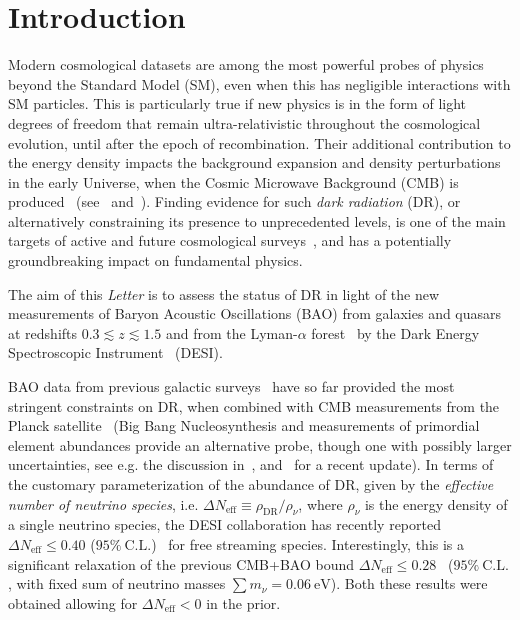 \documentclass[aps,prd,twocolumn,notitlepage,
superscriptaddress,
nofootinbib,floatfix]{revtex4-2}
\begin{document}

\maketitle
\vspace{1em}\noindent

\section{Introduction}
\label{sec:introduction}

Modern cosmological datasets are among the most powerful probes of physics beyond the Standard Model (SM), even when this has negligible interactions with SM particles. This is particularly true if new physics is in the form of light degrees of freedom that remain ultra-relativistic throughout the cosmological evolution, until after the epoch of recombination. Their additional contribution to the energy density impacts the background expansion and density perturbations in the early Universe, when the Cosmic Microwave Background (CMB) is produced~ (see~\cite{Bashinsky:2003tk, Hou:2011ec} and~\cite{Baumann:2015rya}). Finding evidence for such \emph{dark radiation} (DR), or alternatively constraining its presence to unprecedented levels, is one of the main targets of active and future cosmological surveys~\cite{ACT:2020gnv,SPT-3G:2021vps,Amendola:2016saw,LSST:2008ijt,CMB-S4:2022ght,SimonsObservatory:2018koc}, and has a potentially groundbreaking impact on fundamental physics.

The aim of this \emph{Letter} is to assess the status of DR in light of the new measurements of Baryon Acoustic Oscillations (BAO) from galaxies and quasars~\cite{DESI:2024uvr} at redshifts $0.3 \lesssim z\lesssim 1.5$ and from the Lyman-$\alpha$ forest~\cite{DESI:2024lzq} by the Dark Energy Spectroscopic Instrument~\cite{DESI:2024mwx} (DESI).

BAO data from previous galactic surveys~\cite{Beutler:2011hx, Ross:2014qpa, BOSS:2016ntk} have so far provided the most stringent constraints on DR, when combined with CMB measurements from the Planck satellite~\cite{Planck:2018vyg} (Big Bang Nucleosynthesis and measurements of primordial element abundances provide an alternative probe, though one with possibly larger uncertainties, see e.g. the discussion in~\cite{Planck:2019nip}, and~\cite{Yeh:2022heq} for a recent update). In terms of the customary parameterization of the abundance of DR, given by the \emph{effective number of neutrino species}, i.e. $\Delta N_\text{eff}\equiv \rho_\text{DR}/\rho_\nu$, where $\rho_\nu$ is the energy density of a single neutrino species, the DESI collaboration has recently reported $\Delta N_\text{eff}\leq 0.40$ ($95\%~\text{C.L.}$)~\cite{DESI:2024mwx} for free streaming species. Interestingly, this is a significant relaxation of the previous CMB+BAO bound $\Delta N_\text{eff}\leq 0.28$~\cite{Planck:2018vyg} ($95\%~\text{C.L.}$, with fixed sum of neutrino masses $\sum m_\nu =0.06~\text{eV}$). Both these results were obtained allowing for $\Delta N_\text{eff}<0$ in the prior.
\end{document}

